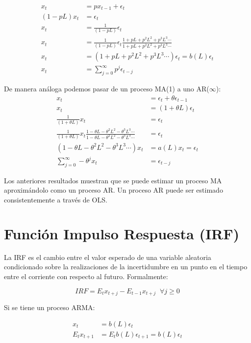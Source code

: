 \documentclass[
]{book}
\begin{document}
\begin{align}
x_{t}&=px_{t-1}+\epsilon_{t}\\ 
(1-pL)x_{t}&=\epsilon_{t}\\
x_{t}&=\frac{1}{(1-pL)}\epsilon_{t}\\
x_{t}&=\frac{1}{(1-pL)}\epsilon_{t}\frac{1+pL+p^{2}L^{2}+p^{3}L^{3}\cdots}{1+pL+p^{2}L^{2}+p^{3}L^{3}\cdots}\\
x_{t}&=(1+pL+p^{2}L^{2}+p^{3}L^{3}\cdots)\epsilon_{t}=b(L)\epsilon_{t}\\
x_{t}&=\sum_{j=0}^{\infty}p^{j}\epsilon_{t-j}
\end{align}

De manera análoga podemos pasar de un proceso MA(1) a uno AR(\(\infty\)):
\begin{align}
x_{t}&=\epsilon_{t}+\theta\epsilon_{t-1}\\ 
x_{t}&=(1+\theta L)\epsilon_{t}\\
\frac{1}{(1+\theta L)}x_{t}&=\epsilon_{t}\\
\frac{1}{(1+\theta L)}x_{t}\frac{1-\theta L-\theta^{2}L^{2}-\theta^{3}L^{3}\cdots}{1-\theta L-\theta^{2}L^{2}-\theta^{3}L^{3}\cdots}&=\epsilon_{t}\\
(1-\theta L-\theta^{2}L^{2}-\theta^{3}L^{3}\cdots)x_{t}&=a(L)x_{t}=\epsilon_{t}\\
\sum_{j=0}^{\infty}-\theta^{j}x_{t}&=\epsilon_{t-j}
\end{align}

Los anteriores resultados muestran que se puede estimar un proceso MA aproximándolo como un proceso AR. Un proceso AR puede ser estimado consistentemente a través de OLS.

\hypertarget{funciuxf3n-impulso-respuesta-irf}{%
\section{Función Impulso Respuesta (IRF)}\label{funciuxf3n-impulso-respuesta-irf}}

La IRF es el cambio entre el valor esperado de una variable aleatoria condicionado sobre la realizaciones de la incertidumbre en un punto en el tiempo entre el corriente con respecto al futuro. Formalmente:

\begin{equation}
IRF=E_{t}x_{t+j}-E_{t-1}x_{t+j}\;\; \forall j\geq 0
\end{equation}

Si se tiene un proceso ARMA:

\begin{align}
x_{t}&=b(L)\epsilon_{t}\\ 
E_{t}x_{t+1}&=E_{t}b(L)\epsilon_{t+1}=b(L)\epsilon_{t}\\
\end{align}
\end{document}
